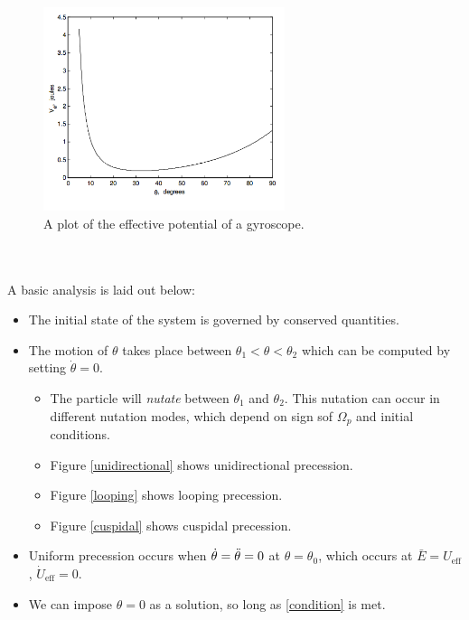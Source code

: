 \documentclass{book}
\begin{document}
\begin{figure}
	\centering
	\includegraphics[width=200pt]{FigureIV.32.png}
	\caption{A plot of the effective potential of a gyroscope.}
	\label{effpotgyro}
\end{figure}
\\\\
A basic analysis is laid out below:
\begin{itemize}
	\item The initial state of the system is governed by conserved quantities.
	\item The motion of $\theta$ takes place between $\theta_1 < \theta < \theta_2$ which can be computed by setting $\Dot{\theta} = 0$.
	\begin{itemize}
		\item The particle will \textit{nutate} between $\theta_1$ and $\theta_2$. This nutation can occur in different nutation modes, which depend on sign sof $\Omega_p$ and initial conditions.
		\item Figure \ref{unidirectional} shows unidirectional precession.
		\item Figure \ref{looping} shows looping precession.
		\item Figure \ref{cuspidal} shows cuspidal precession.
	\end{itemize}
	\item Uniform precession occurs when $\Dot{\theta} = \Ddot{\theta} = 0$ at $\theta = \theta_0$, which occurs at $\bar{E} = U_{\text{eff}}$, $\Dot{U}_{\text{eff}} = 0$.
	\item We can impose $\theta = 0$ as a solution, so long as \eqref{condition} is met.
\end{itemize}
\end{document}
